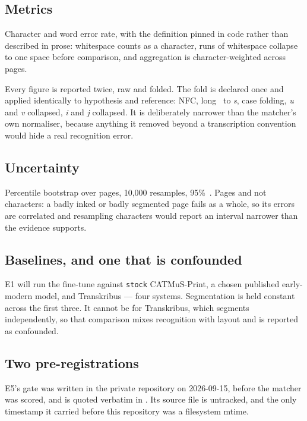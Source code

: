 \subsection{Metrics}

Character and word error rate, with the definition pinned in code rather than
described in prose: whitespace counts as a character, runs of whitespace
collapse to one space before comparison, and aggregation is character-weighted
across pages.

Every figure is reported twice, raw and folded. The fold is declared once and
applied identically to hypothesis and reference: NFC, long~ to
\emph{s}, case folding, \emph{u} and \emph{v} collapsed, \emph{i} and
\emph{j} collapsed. It is deliberately narrower than the
matcher's own normaliser, because anything it removed beyond a transcription
convention would hide a real recognition error.

\subsection{Uncertainty}

Percentile bootstrap over pages, 10,000 resamples, 95\%~\cite{efron1994bootstrap}.
Pages and not characters: a badly inked or badly segmented page fails as a
whole, so its errors are correlated and resampling characters would report an
interval narrower than the evidence supports.

\subsection{Baselines, and one that is confounded}

E1 will run the fine-tune against \texttt{stock} CATMuS-Print, a chosen
published early-modern model, and Transkribus --- four systems. Segmentation is
held constant across the first three. It cannot be for Transkribus, which
segments independently, so that comparison mixes recognition with layout and is
reported as confounded.

\subsection{Two pre-registrations}

E5's gate was written in the private repository on 2026-09-15, before the
matcher was scored, and is quoted verbatim in
. Its source file
is untracked, and the only timestamp it carried before this repository was a
filesystem mtime.

